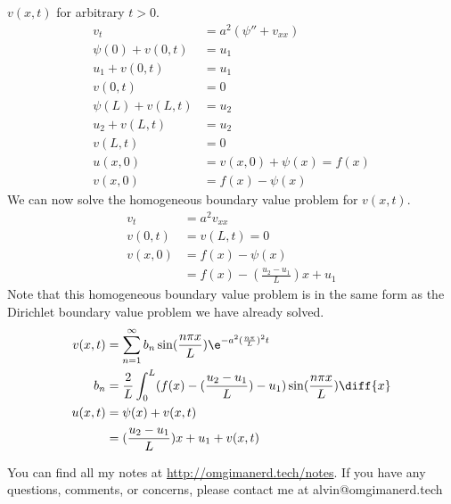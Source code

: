\documentclass{math}
\begin{document}
\( v(x,t) \) for arbitrary \( t>0 \).
\begin{align*}
  v_t &= a^2(\psi''+v_{xx}) \\
  \psi(0)+v(0,t) &= u_1 \\
  u_1+v(0,t) &= u_1 \\
  v(0,t) &= 0 \\
  \psi(L)+v(L,t) &= u_2 \\
  u_2+v(L,t) &= u_2 \\
  v(L,t) &= 0 \\
  u(x,0) &= v(x,0)+\psi(x) = f(x) \\
  v(x,0) &= f(x)-\psi(x)
\end{align*}
We can now solve the homogeneous boundary value problem for \( v(x,t) \).
\begin{align*}
  v_t &= a^2v_{xx} \\
  v(0,t) &= v(L,t) = 0 \\
  v(x,0) &= f(x)-\psi(x) \\
  &= f(x)-(\frac{u_2-u_1}{L})x+u_1
\end{align*}
Note that this homogeneous boundary value problem is in the same form as the
Dirichlet boundary value problem we have already solved.
\begin{align*}
  v(x,t) &= \sum_{n=1}^{\infty}
    b_n\sin(\frac{n\pi x}{L})\e^{-a^2(\frac{n\pi}{L})^2t} \\
  b_n &= \frac{2}{L}
    \int_{0}^{L}(f(x)-(\frac{u_2-u_1}{L})-u_1)\sin(\frac{n\pi x}{L})\diff{x} \\
  u(x,t) &= \psi(x)+v(x,t) \\
  &= (\frac{u_2-u_1}{L})x+u_1+v(x,t)
\end{align*}

\begin{center}
  You can find all my notes at \url{http://omgimanerd.tech/notes}. If you have
  any questions, comments, or concerns, please contact me at
  alvin@omgimanerd.tech
\end{center}
\end{document}
